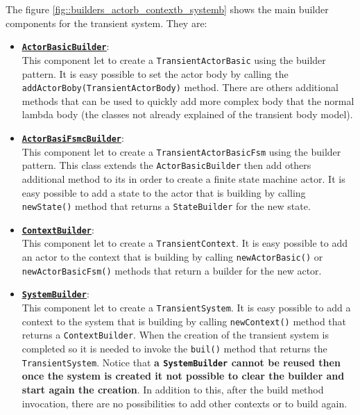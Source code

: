 The figure \ref{fig::builders_actorb_contextb_systemb} shows the main builder components for the transient system. They are:
\begin{itemize}
	\item 	\href{https://github.com/LM-96/QA-Extensions/blob/main/it.unibo.qakactor/src/main/kotlin/builders/ActorBasicBuilder.kt}{\underline{\textbf{\texttt{ActorBasicBuilder}}}}:\\
	This component let to create a \texttt{TransientActorBasic} using the builder pattern. It is easy possible to set the actor body by calling the \verb*|addActorBoby(TransientActorBody)| method. There are others additional methods that can be used to quickly add  more complex body that the normal lambda body (the classes not already explained of the transient body model).
	
	\item 	\href{https://github.com/LM-96/QA-Extensions/blob/main/it.unibo.qakactor/src/main/kotlin/builders/ActorBasicFsmBuilder.kt}{\underline{\textbf{\texttt{ActorBasiFsmcBuilder}}}}:\\
	This component let to create a \texttt{TransientActorBasicFsm} using the builder pattern. This class extends the \texttt{ActorBasicBuilder} then add others additional method to its in order to create a finite state machine actor. It is easy possible to add a state to the actor that is building by calling \verb*|newState()| method that returns a \texttt{StateBuilder} for the new state.
	
	\item 	\href{https://github.com/LM-96/QA-Extensions/blob/main/it.unibo.qakactor/src/main/kotlin/builders/ContextBuilder.kt}{\underline{\textbf{\texttt{ContextBuilder}}}}:\\
	This component let to create a \texttt{TransientContext}. It is easy possible to add an actor to the context that is building by calling \verb*|newActorBasic()| or \verb*|newActorBasicFsm()| methods that return a builder for the new actor.
	
	\item 	\href{https://github.com/LM-96/QA-Extensions/blob/main/it.unibo.qakactor/src/main/kotlin/builders/SystemBuilder.kt}{\underline{\textbf{\texttt{SystemBuilder}}}}:\\
	This component let to create a \texttt{TransientSystem}. It is easy possible to add a context to the system that is building by calling \verb*|newContext()| method that returns a \texttt{ContextBuilder}. When the creation of the transient system is completed so it is needed to invoke the \verb*|buil()| method that returns the \texttt{TransientSystem}. Notice that \textbf{a \texttt{SystemBuilder} cannot be reused then once the system is created it not possible to clear the builder and start again the creation}. In addition to this, after the build method invocation, there are no possibilities to add other contexts or to build again.
\end{itemize}

